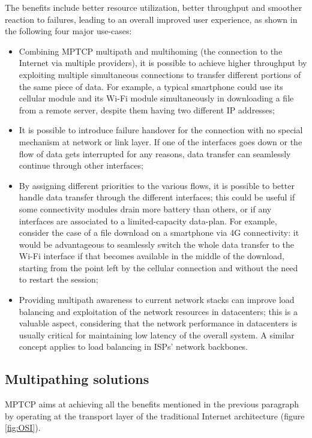 The benefits include better resource utilization, better throughput and smoother reaction to failures, leading to an overall improved user experience, as shown in the following four major use-cases:
\begin{itemize}
  \item Combining MPTCP multipath and multihoming (the connection to the Internet via multiple providers), it is possible to achieve higher throughput by exploiting multiple simultaneous connections to transfer different portions of the same piece of data. For example, a typical smartphone could use its cellular module and its Wi-Fi module simultaneously in downloading a file from a remote server, despite them having two different IP addresses;
  \item It is possible to introduce failure handover for the connection with no special mechanism at network or link layer. If one of the interfaces goes down or the flow of data gets interrupted for any reasons, data transfer can seamlessly continue through other interfaces;
  \item By assigning different priorities to the various flows, it is possible to better handle data transfer through the different interfaces; this could be useful if some connectivity modules drain more battery than others, or if any interfaces are associated to a limited-capacity data-plan. For example, consider the case of a file download on a smartphone via 4G connectivity: it would be advantageous to seamlessly switch the whole data transfer to the Wi-Fi interface if that becomes available in the middle of the download, starting from the point left by the cellular connection and without the need to restart the session;
  \item Providing multipath awareness to current network stacks can improve load balancing and exploitation of the network resources in datacenters; this is a valuable aspect, considering that the network performance in datacenters is usually critical for maintaining low latency of the overall system. A similar concept applies to load balancing in ISPs' network backbones.
\end{itemize}

\subsection{Multipathing solutions}
MPTCP aims at achieving all the benefits mentioned in the previous paragraph by operating at the transport layer of the traditional Internet architecture (figure \ref{fig:OSI}).

